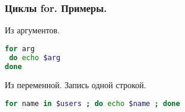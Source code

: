 \begin{frame}[fragile]
\frametitle{ Циклы for. Примеры.}
  \begin{block}{Из аргументов.}
    \begin{lstlisting}[language=sh,frame=single]
for arg
 do echo $arg 
done
    \end{lstlisting}
  \end{block}
  \begin{block}{Из переменной. Запись одной строкой.}
    \begin{lstlisting}[language=sh,frame=single]
for name in $users ; do echo $name ; done
    \end{lstlisting}
  \end{block}
\end{frame}
